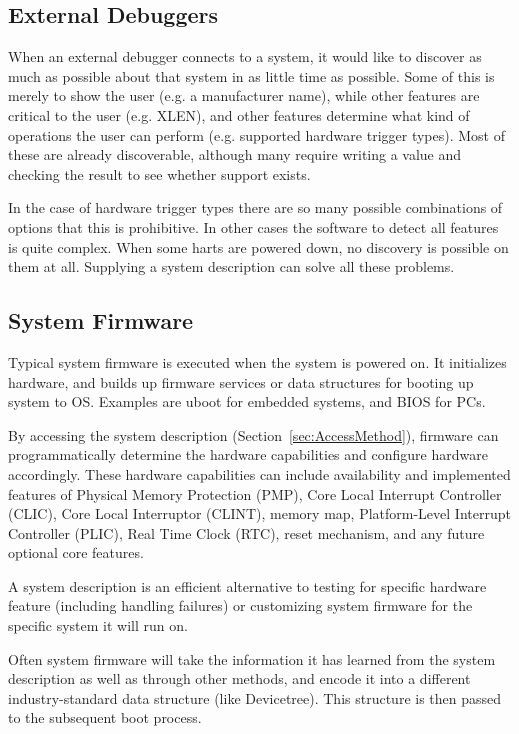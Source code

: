\subsection{External Debuggers}

When an external debugger connects to a system, it would like to discover as
much as possible about that system in as little time as possible. Some of this
is merely to show the user (e.g. a manufacturer name), while other features are
critical to the user (e.g. XLEN), and other features determine what kind of
operations the user can perform (e.g. supported hardware trigger types). Most
of these are already discoverable, although many require writing a value and
checking the result to see whether support exists.

In the case of hardware trigger types there are so many possible combinations
of options that this is prohibitive. In other cases the software to detect all
features is quite complex. When some harts are powered down, no discovery is
possible on them at all. Supplying a system description can solve all these
problems.

\subsection{System Firmware}

Typical system firmware is executed when the system is powered on. It
initializes hardware, and builds up firmware services or data structures for
booting up system to OS. Examples are uboot for embedded systems, and BIOS for
PCs.

By accessing the system description (Section~\ref{sec:AccessMethod}), firmware
can programmatically determine the hardware capabilities and configure hardware
accordingly.  These hardware capabilities can include availability and
implemented features of Physical Memory Protection (PMP), Core Local Interrupt
Controller (CLIC), Core Local Interruptor (CLINT), memory map, Platform-Level
Interrupt Controller (PLIC), Real Time Clock (RTC), reset mechanism, and any
future optional core features.

A system description is an efficient alternative to testing for specific
hardware feature (including handling failures) or customizing system firmware
for the specific system it will run on.

Often system firmware will take the information it has learned from the system
description as well as through other methods, and encode it into a different
industry-standard data structure (like Devicetree).  This structure is then
passed to the subsequent boot process.

